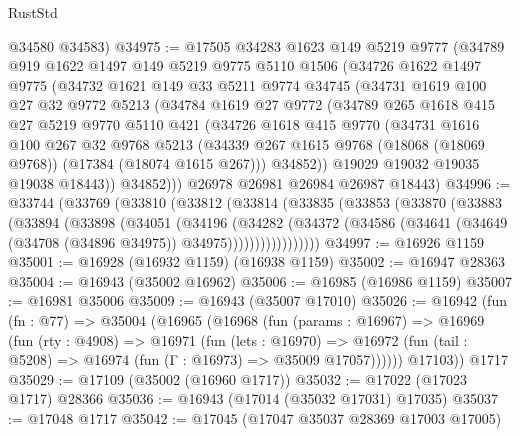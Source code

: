 \begin{lexlean}{RustStd}
\begin{coremodule}
      @34580
      @34583)
@34975 := @17505
    @34283
    @1623
    @149
    @5219
    @9777
    (@34789
      @919
      @1622
      @1497
      @149
      @5219
      @9775
      @5110
      @1506
      (@34726
        @1622
        @1497
        @9775
        (@34732
          @1621
          @149
          @33
          @5211
          @9774
          @34745
          (@34731
            @1619
            @100
            @27
            @32
            @9772
            @5213
            (@34784
              @1619
              @27
              @9772
              (@34789
                @265
                @1618
                @415
                @27
                @5219
                @9770
                @5110
                @421
                (@34726
                  @1618
                  @415
                  @9770
                  (@34731
                    @1616
                    @100
                    @267
                    @32
                    @9768
                    @5213
                    (@34339 @267 @1615 @9768 (@18068 (@18069 @9768)) (@17384 (@18074 @1615 @267)))
                    @34852))
                @19029
                @19032
                @19035
                @19038
                @18443))
            @34852)))
      @26978
      @26981
      @26984
      @26987
      @18443)
@34996 := @33744
    (@33769
      (@33810
        (@33812
          (@33814
            (@33835
              (@33853
                (@33870
                  (@33883
                    (@33894
                      (@33898
                        (@34051
                          (@34196
                            (@34282
                              (@34372
                                (@34586
                                  (@34641 (@34649 (@34708 (@34896 @34975)) @34975)))))))))))))))))
@34997 := @16926 @1159
@35001 := @16928 (@16932 @1159) (@16938 @1159)
@35002 := @16947 @28363
@35004 := @16943 (@35002 @16962)
@35006 := @16985 (@16986 @1159)
@35007 := @16981 @35006
@35009 := @16943 (@35007 @17010)
@35026 := @16942
    (fun (fn : @77) =>
    @35004
      (@16965
        (@16968
          (fun (params : @16967) =>
          @16969
            (fun (rty : @4908) =>
            @16971
              (fun (lets : @16970) =>
              @16972 (fun (tail : @5208) => @16974 (fun (Γ : @16973) => @35009 @17057))))))
        @17103))
    @1717
@35029 := @17109 (@35002 (@16960 @1717))
@35032 := @17022 (@17023 @1717) @28366
@35036 := @16943 (@17014 (@35032 @17031) @17035)
@35037 := @17048 @1717
@35042 := @17045 (@17047 @35037 @28369 @17003 @17005)

\end{coremodule}
\end{lexlean}
